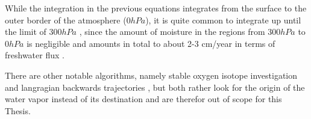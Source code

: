 While the integration in the previous equations integrates from the surface to the outer border of the atmosphere ($0 hPa$), it is quite common to integrate up until the limit of $300 hPa$ \cite{ayantobo_integrated_2022, zhu_proposed_1998, kim_ensos_2015, guirguis_circulation_2018}, since the amount of moisture in the regions from $300 hPa$ to $0 hPa$ is negligible and amounts in total to about 2-3 cm/year in terms of freshwater flux \cite{zhou_atmospheric_2005}.

There are other notable algorithms, namely stable oxygen isotope investigation \cite{ma_atmospheric_2018} and langragian backwards trajectories \cite{zhao_lagrangian_2021}, but both rather look for the origin of the  water vapor instead of its destination and are therefor out of scope for this Thesis.

%
%
%
%
%
%
%
%
%
%

